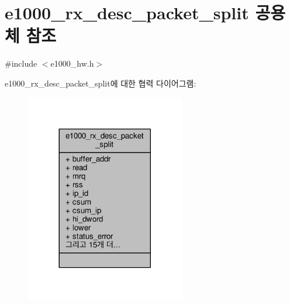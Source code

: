 \hypertarget{unione1000__rx__desc__packet__split}{}\section{e1000\+\_\+rx\+\_\+desc\+\_\+packet\+\_\+split 공용체 참조}
\label{unione1000__rx__desc__packet__split}


{\ttfamily \#include $<$e1000\+\_\+hw.\+h$>$}



e1000\+\_\+rx\+\_\+desc\+\_\+packet\+\_\+split에 대한 협력 다이어그램\+:
\nopagebreak
\begin{figure}[H]
\begin{center}
\leavevmode
\includegraphics[width=197pt]{unione1000__rx__desc__packet__split__coll__graph}
\end{center}
\end{figure}
